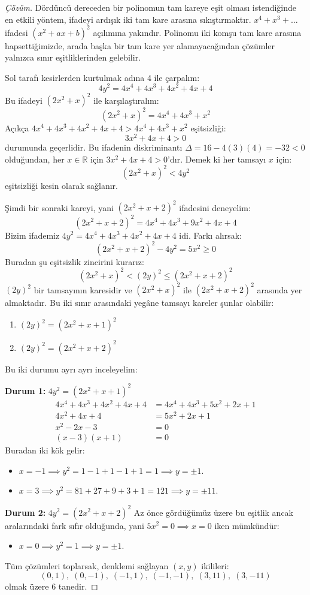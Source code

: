 \begin{proof}[Çözüm]
Dördüncü dereceden bir polinomun tam kareye eşit olması istendiğinde en etkili yöntem, ifadeyi ardışık iki tam kare arasına sıkıştırmaktır. $x^4 + x^3 + \dots$ ifadesi $(x^2 + ax + b)^2$ açılımına yakındır. Polinomu iki komşu tam kare arasına hapsettiğimizde, arada başka bir tam kare yer alamayacağından çözümler yalnızca sınır eşitliklerinden gelebilir.

Sol tarafı kesirlerden kurtulmak adına 4 ile çarpalım:
\[
4y^2 = 4x^4 + 4x^3 + 4x^2 + 4x + 4
\]
Bu ifadeyi $(2x^2 + x)^2$ ile karşılaştıralım:
\[
(2x^2 + x)^2 = 4x^4 + 4x^3 + x^2
\]
Açıkça $4x^4 + 4x^3 + 4x^2 + 4x + 4 > 4x^4 + 4x^3 + x^2$ eşitsizliği:
\[
3x^2 + 4x + 4 > 0
\]
durumunda geçerlidir. Bu ifadenin diskriminantı $\Delta = 16 - 4(3)(4) = -32 < 0$ olduğundan, her $x \in \mathbb{R}$ için $3x^2 + 4x + 4 > 0$'dır.
Demek ki her tamsayı $x$ için:
\[
(2x^2 + x)^2 < 4y^2
\]
eşitsizliği kesin olarak sağlanır.

Şimdi bir sonraki kareyi, yani $(2x^2 + x + 2)^2$ ifadesini deneyelim:
\[
(2x^2 + x + 2)^2 = 4x^4 + 4x^3 + 9x^2 + 4x + 4
\]
Bizim ifademiz $4y^2 = 4x^4 + 4x^3 + 4x^2 + 4x + 4$ idi. Farkı alırsak:
\[
(2x^2 + x + 2)^2 - 4y^2 = 5x^2 \ge 0
\]
Buradan şu eşitsizlik zincirini kurarız:
\[
(2x^2 + x)^2 < (2y)^2 \le (2x^2 + x + 2)^2
\]
$(2y)^2$ bir tamsayının karesidir ve $(2x^2 + x)^2$ ile $(2x^2 + x + 2)^2$ arasında yer almaktadır. Bu iki sınır arasındaki yegâne tamsayı kareler şunlar olabilir:
\begin{enumerate}
    \item $(2y)^2 = (2x^2 + x + 1)^2$
    \item $(2y)^2 = (2x^2 + x + 2)^2$
\end{enumerate}

Bu iki durumu ayrı ayrı inceleyelim:

\textbf{Durum 1:} $4y^2 = (2x^2 + x + 1)^2$
\begin{align*}
4x^4 + 4x^3 + 4x^2 + 4x + 4 &= 4x^4 + 4x^3 + 5x^2 + 2x + 1 \\
4x^2 + 4x + 4 &= 5x^2 + 2x + 1 \\
x^2 - 2x - 3 &= 0 \\
(x - 3)(x + 1) &= 0
\end{align*}
Buradan iki kök gelir:
\begin{itemize}
    \item $x = -1 \implies y^2 = 1 - 1 + 1 - 1 + 1 = 1 \implies y = \pm 1$.
    \item $x = 3 \implies y^2 = 81 + 27 + 9 + 3 + 1 = 121 \implies y = \pm 11$.
\end{itemize}

\textbf{Durum 2:} $4y^2 = (2x^2 + x + 2)^2$
Az önce gördüğümüz üzere bu eşitlik ancak aralarındaki fark sıfır olduğunda, yani $5x^2 = 0 \implies x = 0$ iken mümkündür:
\begin{itemize}
    \item $x = 0 \implies y^2 = 1 \implies y = \pm 1$.
\end{itemize}

Tüm çözümleri toplarsak, denklemi sağlayan $(x, y)$ ikilileri:
\[
(0, 1), \; (0, -1), \; (-1, 1), \; (-1, -1), \; (3, 11), \; (3, -11)
\]
olmak üzere 6 tanedir.
\end{proof}

